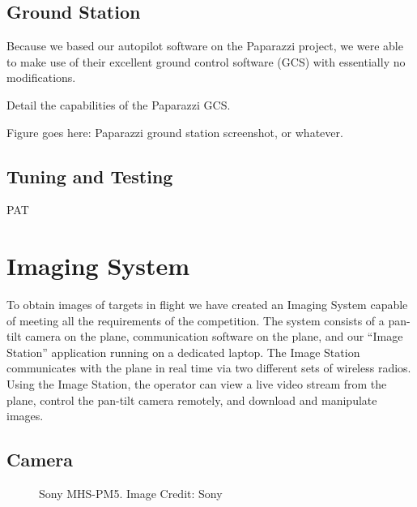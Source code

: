 \documentclass[10pt]{report}
\begin{document}
\subsection{Ground Station}
Because we based our autopilot software on the Paparazzi project, we were able to make use of their excellent ground control software (GCS) with essentially no modifications.

Detail the capabilities of the Paparazzi GCS.

Figure goes here: Paparazzi ground station screenshot, or whatever. 
\subsection{Tuning and Testing}
PAT

\section{Imaging System}

To obtain images of targets in flight we have created an Imaging System capable of meeting all the requirements of the competition.  The system consists of a pan-tilt camera on the plane, communication software on the plane, and our ``Image Station'' application running on a dedicated laptop.  The Image Station communicates with the plane in real time via two different sets of wireless radios.  Using the Image Station, the operator can view a live video stream from the plane, control the pan-tilt camera remotely, and download and manipulate images.

\subsection{Camera}

\begin{figure} [h!]
	\centering
	\caption{Sony MHS-PM5. Image Credit: Sony}
	\label{fig:camera}
\end{figure}
\end{document}
